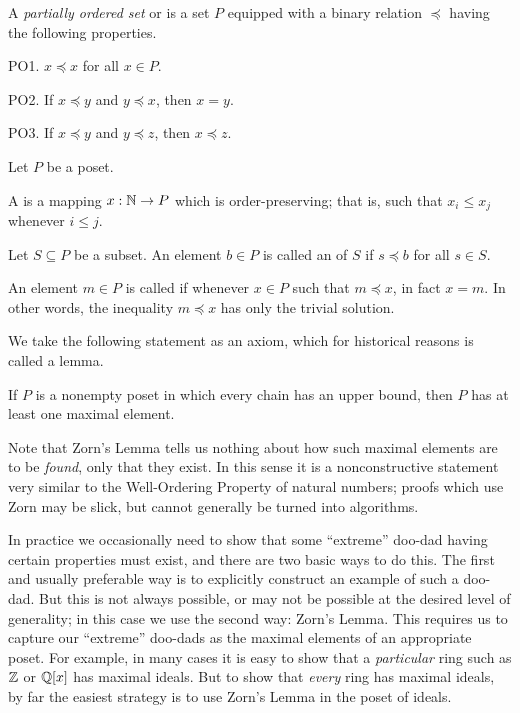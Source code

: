 \begin{dfn}[Poset]
A \emph{partially ordered set} or  is a set \(P\) equipped with a binary relation \(\preceq\) having the following properties.
\begin{proplist}
\item[PO1.] \(x \preceq x\) for all \(x \in P\).
\item[PO2.] If \(x \preceq y\) and \(y \preceq x\), then \(x = y\).
\item[PO3.] If \(x \preceq y\) and \(y \preceq z\), then \(x \preceq z\).
\end{proplist}
\end{dfn}

\begin{dfn}
Let \(P\) be a poset.
\begin{proplist}
\item A  is a mapping \(x : \mathbb{N} \rightarrow P\) which is order-preserving; that is, such that \(x_i \leq x_j\) whenever \(i \leq j\).
\item Let \(S \subseteq P\) be a subset. An element \(b \in P\) is called an  of \(S\) if \(s \preceq b\) for all \(s \in S\).
\item An element \(m \in P\) is called  if whenever \(x \in P\) such that \(m \preceq x\), in fact \(x = m\). In other words, the inequality \(m \preceq x\) has only the trivial solution.
\end{proplist}
\end{dfn}

We take the following statement as an axiom, which for historical reasons is called a lemma.

\begin{axiom}
If \(P\) is a nonempty poset in which every chain has an upper bound, then \(P\) has at least one maximal element.
\end{axiom}

Note that Zorn's Lemma tells us nothing about how such maximal elements are to be \emph{found}, only that they exist. In this sense it is a nonconstructive statement very similar to the Well-Ordering Property of natural numbers; proofs which use Zorn may be slick, but cannot generally be turned into algorithms.

In practice we occasionally need to show that some ``extreme'' doo-dad having certain properties must exist, and there are two basic ways to do this. The first and usually preferable way is to explicitly construct an example of such a doo-dad. But this is not always possible, or may not be possible at the desired level of generality; in this case we use the second way: Zorn's Lemma. This requires us to capture our ``extreme'' doo-dads as the maximal elements of an appropriate poset. For example, in many cases it is easy to show that a \emph{particular} ring such as \(\mathbb{Z}\) or \(\mathbb{Q}[x]\) has maximal ideals. But to show that \emph{every} ring has maximal ideals, by far the easiest strategy is to use Zorn's Lemma in the poset of ideals.

